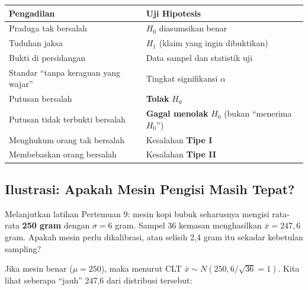 \documentclass[
  indonesian,
  letterpaper,
]{book}
\newcounter{none} %
\begin{document}
{\def\LTcaptype{none} %
\begin{longtable}[]{@{}
  >{\raggedright\arraybackslash}p{}
  >{\raggedright\arraybackslash}p{}@{}}
\toprule\noalign{}
\begin{minipage}[b]{\linewidth}\raggedright
Pengadilan
\end{minipage} & \begin{minipage}[b]{\linewidth}\raggedright
Uji Hipotesis
\end{minipage} \\
\midrule\noalign{}
\endhead
\bottomrule\noalign{}
\endlastfoot
Praduga tak bersalah & \(H_0\) diasumsikan benar \\
Tuduhan jaksa & \(H_1\) (klaim yang ingin dibuktikan) \\
Bukti di persidangan & Data sampel dan statistik uji \\
Standar ``tanpa keraguan yang wajar'' & Tingkat signifikansi
\(\alpha\) \\
Putusan bersalah & \textbf{Tolak} \(H_0\) \\
Putusan tidak terbukti bersalah & \textbf{Gagal menolak} \(H_0\) (bukan
``menerima \(H_0\)'') \\
Menghukum orang tak bersalah & Kesalahan \textbf{Tipe I} \\
Membebaskan orang bersalah & Kesalahan \textbf{Tipe II} \\
\end{longtable}
}

\subsection{Ilustrasi: Apakah Mesin Pengisi Masih
Tepat?}\label{ilustrasi-apakah-mesin-pengisi-masih-tepat}

Melanjutkan latihan Pertemuan 9: mesin kopi bubuk seharusnya mengisi
rata-rata \textbf{250 gram} dengan \(\sigma = 6\) gram. Sampel 36
kemasan menghasilkan \(\bar{x} = 247{,}6\) gram. Apakah mesin perlu
dikalibrasi, atau selisih 2,4 gram itu sekadar kebetulan sampling?

Jika mesin benar (\(\mu = 250\)), maka menurut CLT
\(\bar{x} \sim N(250, 6/\sqrt{36} = 1)\). Kita lihat seberapa ``jauh''
247,6 dari distribusi tersebut:
\end{document}
